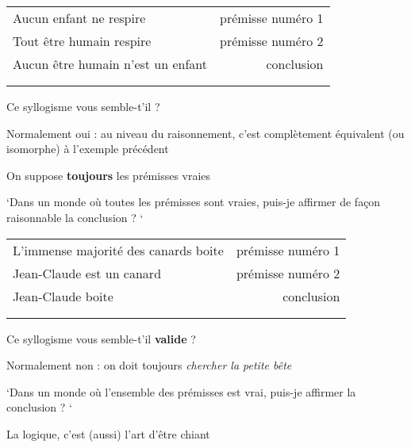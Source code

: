 \begin{frame}
	
\begin{tabular}{lr}
Aucun enfant ne respire& \hspace{1cm} prémisse numéro 1 \\ 
Tout être humain respire & prémisse numéro 2 \\ \cline{1-1}
Aucun être humain n'est un enfant& conclusion\\ \\ \\
\end{tabular}

\pause

Ce syllogisme vous semble-t'il   ? \pause \newline 

Normalement oui \pause : au niveau du raisonnement, c'est complètement équivalent (ou isomorphe) à l'exemple précédent \newline \pause

On suppose \textbf{toujours} les prémisses vraies\newline \pause

`Dans un monde où toutes les prémisses sont vraies, puis-je affirmer de façon raisonnable la conclusion ? ` \pause

\end{frame}


\begin{frame}
	
\begin{tabular}{lr}
L'immense majorité des canards boite & \hspace{1cm} prémisse numéro 1 \\ 
Jean-Claude est un canard & prémisse numéro 2 \\ \cline{1-1}
Jean-Claude boite & conclusion\\ \\ \\
\end{tabular}

\pause

Ce syllogisme vous semble-t'il \textbf{valide} ? \pause \newline 

Normalement non \pause : on doit toujours \textit{chercher la petite bête}\newline \pause

`Dans un monde où l'ensemble des prémisses est vrai, puis-je affirmer   la conclusion ? ` \newline \pause \pause 

La logique, c'est (aussi) l'art d'être chiant

\end{frame}


